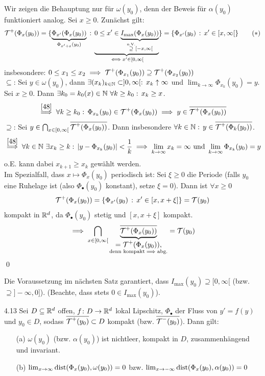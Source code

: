 \documentclass[a4paper]{article}
\begin{document}
\begin{Beweis}
Wir zeigen die Behauptung nur für $\omega(y_0)$, denn der Beweis für $\alpha(y_0)$ funktioniert analog. Sei $x\ge0$. Zunächst gilt:
\[\operatorname{\mathcal{T}}^+(\Phi_x(y_0))=\{\underbrace{\Phi_{x'}(\Phi_x(y_0))}_{\Phi_{x'+x}(y_0)}\,:\, 
\underbrace{0\le x'\in 
\underbrace{I_{\max}(\Phi_x(y_0))}_{\overset{\text{n.V.}}{\supseteq}[-x,\infty[}}_{\iff x'\in[0,\infty[}\}
=\{\Phi_{x'}(y_0)\,:\,x'\in[x,\infty[\}\tag{$*$}\label{48}\]
insbesondere: $0\le x_1\le x_2\implies \operatorname{\mathcal{T}}^+(\Phi_{x_1}(y_0))\supseteq\operatorname{\mathcal{T}}^+(\Phi_{x_2}(y_0))$\\
\glqq $\subseteq$\grqq: Sei $y\in \omega(y_0)$, dann $\exists(x_k)_{k\in\operatorname{\mathbb N}}\subset ]0,\infty[:\, x_k\uparrow\infty$ und $\lim_{k\to\infty}\Phi_{x_k}(y_0)=y$. Sei $x\ge 0$. Dann $\exists k_0=k_0(x)\in\operatorname{\mathbb N}\,\forall k\ge k_0:\, x_k\ge x$.
\[\overset{\eqref{48}}{\implies}\forall k\ge k_0:\,\Phi_{x_k}(y_0)\in\operatorname{\mathcal{T}}^+(\Phi_x(y_0))\implies y\in \overline{\operatorname{\mathcal{T}}^+(\Phi_x(y_0))}\]
\glqq $\supseteq$\grqq: Sei $y\in\bigcap_{x\in[0,\infty[}\overline{\operatorname{\mathcal{T}}^+(\Phi_x(y_0))}$. Dann insbesondere $\forall k\in\operatorname{\mathbb N}:\,y\in\overline{\operatorname{\mathcal{T}}^+(\Phi_k(y_0))}$.
\[\overset{\eqref{48}}{\implies}\forall k\in\operatorname{\mathbb N}\,\exists x_k\ge k:\,|y-\Phi_{x_k}(y_0)|<\frac{1}{k}\implies \lim_{k\to\infty}x_k=\infty\text{ und }\lim_{k\to\infty}\Phi_{x_k}(y_0)=y\]
o.E. kann dabei $x_{k+1}\ge x_k$ gewählt werden.\\
Im Spezialfall, dass $x\mapsto \Phi_x(y_0)$ periodisch ist: Sei $\xi\ge 0$ die Periode (falls $y_0$ eine Ruhelage ist (also $\Phi_{\bullet}(y_0)$ konstant), setze $\xi=0$). Dann ist $\forall x\ge 0$
\[\operatorname{\mathcal{T}}^+(\Phi_x(y_0))=\{\Phi_{x'}(y_0)\,:\,x'\in[x,x+\xi]\}=\operatorname{\mathcal{T}}(y_0)\]
kompakt in $\mathbb R^d$, da $\Phi_{\bullet}(y_0)$ stetig und $[x,x+\xi]$ kompakt.
\[\implies \bigcap_{x\in[0,\infty[}\underbrace{\overline{\operatorname{\mathcal{T}}^+(\Phi_x(y_0))}}_{\substack{\displaystyle=\operatorname{\mathcal{T}}^+(\Phi_x(y_0)),\\\text{denn kompakt$\implies$abg.}}}=\operatorname{\mathcal{T}}(y_0)\]\qed
\end{Beweis}

Die Voraussetzung im nächsten Satz garantiert, dass $I_{\max}(y_0)\supseteq[0,\infty[$ (bzw. $\supseteq ]-\infty,0]$). (Beachte, dass stets $0\in I_{\max}(y_0)$).

\begin{Satz}{}{4.13}
Sei $D\subseteq \mathbb R^d$ offen, $f\colon D\to\mathbb R^d$ lokal Lipschitz, $\Phi_{\bullet}$ der Fluss von $y'=f(y)$ und $y_0\in D$, sodass $\overline{\operatorname{\mathcal{T}}^+(y_0)}\subset D$ kompakt (bzw. $\overline{\operatorname{\mathcal{T}}^-(y_0)}$). Dann gilt:
\begin{itemize}
\item[(a)] $\omega(y_0)$ (bzw. $\alpha(y_0)$) ist nichtleer, kompakt in $D$, zusammenhängend und invariant.
\item[(b)] $\lim_{x\to\infty}\operatorname{\mathrm{dist}}(\Phi_x(y_0),\omega(y_0))=0$ bzw. $\lim_{x\to-\infty}\operatorname{\mathrm{dist}}(\Phi_x(y_0),\alpha(y_0))=0$
\end{itemize}
\end{Satz}
\end{document}
